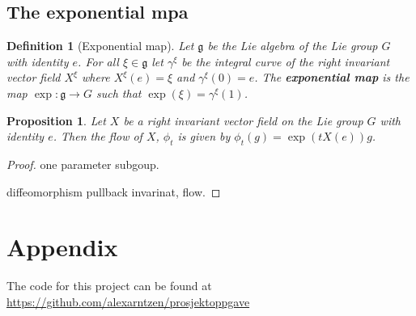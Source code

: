 \documentclass[a4paper]{article}
\newtheorem{definition}{Definition}[section]
\newtheorem{proposition}[theorem]{Proposition}
\begin{document}
\subsection{The exponential mpa}

\begin{definition}[Exponential map]
Let $\mathfrak{g}$ be the Lie algebra of the Lie group $G$ with identity $e$. For all $\xi \in \mathfrak{g}$ let $\gamma^{\xi}$ be the integral curve of the right invariant vector field $X^{\xi}$ where $X^\xi (e)=\xi$ and $\gamma^\xi(0) = e$. The \textbf{exponential map} is the map $\exp : \mathfrak{g} \rightarrow G$ such that $\exp(\xi) = \gamma^\xi(1)$. 
\end{definition}
\begin{proposition}
  Let $X$ be a right invariant vector field on the Lie group $G$ with identity $e$. Then the flow of $X$, $\phi_t$ is given by $\phi_t(g) = \exp(tX(e))g$.
\end{proposition}
\begin{proof}
  \item one parameter subgoup. 
  \item diffeomorphism pullback invarinat, flow. 
\end{proof}

\cite{lystad2019}

\section*{Appendix}
The code for this project can be found at \url{https://github.com/alexarntzen/prosjektoppgave}


\printbibliography
\end{document}
